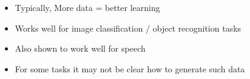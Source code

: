 \begin{frame}
	\vspace{4em}    
	\begin{overlayarea}{\textwidth}{\textheight}
						
		\begin{itemize}
			\item <1-> Typically, More data = better learning
			\item <2->  Works well for image classification / object recognition tasks
			\item <3->  Also shown to work well for speech
			\item <4->  For some tasks it may not be clear how to generate such data
		\end{itemize}
						
	\end{overlayarea}
\end{frame}

